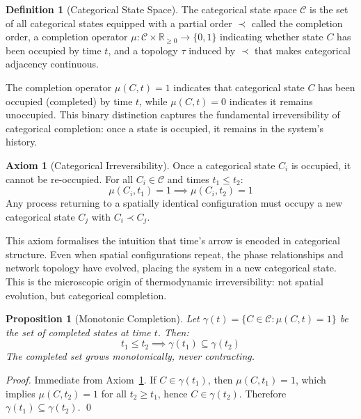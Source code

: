 \documentclass[12pt,a4paper]{article}
\newtheorem{proposition}[theorem]{Proposition}
\theoremstyle{definition}
\newtheorem{definition}[theorem]{Definition}
\newtheorem{axiom}[theorem]{Axiom}
\theoremstyle{remark}
\newcommand{\catspace}{\mathcal{C}}
\begin{document}
\begin{definition}[Categorical State Space]
\label{def:categorical_state_space}
The categorical state space $\catspace$ is the set of all categorical states equipped with a partial order $\prec$ called the completion order, a completion operator $\mu: \catspace \times \mathbb{R}_{\geq 0} \to \{0, 1\}$ indicating whether state $C$ has been occupied by time $t$, and a topology $\tau$ induced by $\prec$ that makes categorical adjacency continuous.
\end{definition}

The completion operator $\mu(C, t) = 1$ indicates that categorical state $C$ has been occupied (completed) by time $t$, while $\mu(C, t) = 0$ indicates it remains unoccupied. This binary distinction captures the fundamental irreversibility of categorical completion: once a state is occupied, it remains in the system's history.

\begin{axiom}[Categorical Irreversibility]
\label{axiom:categorical_irreversibility}
Once a categorical state $C_i$ is occupied, it cannot be re-occupied. For all $C_i \in \catspace$ and times $t_1 \leq t_2$:
\begin{equation}
\mu(C_i, t_1) = 1 \implies \mu(C_i, t_2) = 1
\label{eq:irreversibility}
\end{equation}
Any process returning to a spatially identical configuration must occupy a new categorical state $C_j$ with $C_i \prec C_j$.
\end{axiom}

This axiom formalises the intuition that time's arrow is encoded in categorical structure. Even when spatial configurations repeat, the phase relationships and network topology have evolved, placing the system in a new categorical state. This is the microscopic origin of thermodynamic irreversibility: not spatial evolution, but categorical completion.

\begin{proposition}[Monotonic Completion]
\label{prop:monotonic_completion}
Let $\gamma(t) = \{C \in \catspace : \mu(C, t) = 1\}$ be the set of completed states at time $t$. Then:
\begin{equation}
t_1 \leq t_2 \implies \gamma(t_1) \subseteq \gamma(t_2)
\end{equation}
The completed set grows monotonically, never contracting.
\end{proposition}

\begin{proof}
Immediate from Axiom~\ref{axiom:categorical_irreversibility}. If $C \in \gamma(t_1)$, then $\mu(C, t_1) = 1$, which implies $\mu(C, t_2) = 1$ for all $t_2 \geq t_1$, hence $C \in \gamma(t_2)$. Therefore $\gamma(t_1) \subseteq \gamma(t_2)$. \qed
\end{proof}
\end{document}
